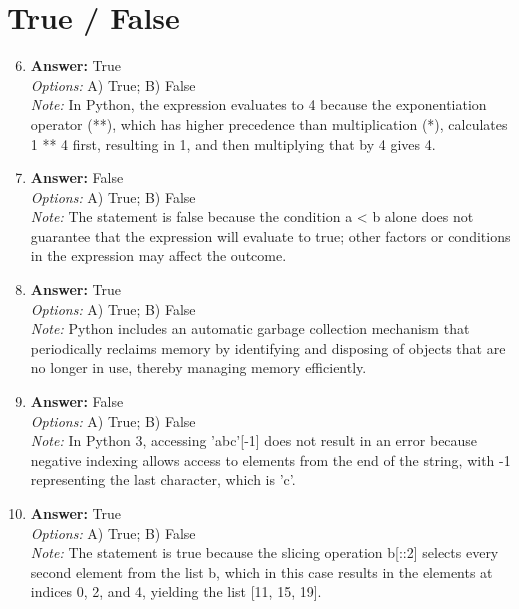 \documentclass[12pt]{article}
\begin{document}
\section*{True / False}
\begin{enumerate}[label=\arabic*.]
\setcounter{enumi}{5}
\item \textbf{Answer:} True
\\ \textit{Options:} A) True; B) False
\\ \textit{Note:} In Python, the expression evaluates to 4 because the exponentiation operator (**), which has higher precedence than multiplication (*), calculates 1 ** 4 first, resulting in 1, and then multiplying that by 4 gives 4.
\item \textbf{Answer:} False
\\ \textit{Options:} A) True; B) False
\\ \textit{Note:} The statement is false because the condition a \textless{} b alone does not guarantee that the expression will evaluate to true; other factors or conditions in the expression may affect the outcome.
\item \textbf{Answer:} True
\\ \textit{Options:} A) True; B) False
\\ \textit{Note:} Python includes an automatic garbage collection mechanism that periodically reclaims memory by identifying and disposing of objects that are no longer in use, thereby managing memory efficiently.
\item \textbf{Answer:} False
\\ \textit{Options:} A) True; B) False
\\ \textit{Note:} In Python 3, accessing 'abc'[-1] does not result in an error because negative indexing allows access to elements from the end of the string, with -1 representing the last character, which is 'c'.
\item \textbf{Answer:} True
\\ \textit{Options:} A) True; B) False
\\ \textit{Note:} The statement is true because the slicing operation b[::2] selects every second element from the list b, which in this case results in the elements at indices 0, 2, and 4, yielding the list [11, 15, 19].
\end{enumerate}
\end{document}
